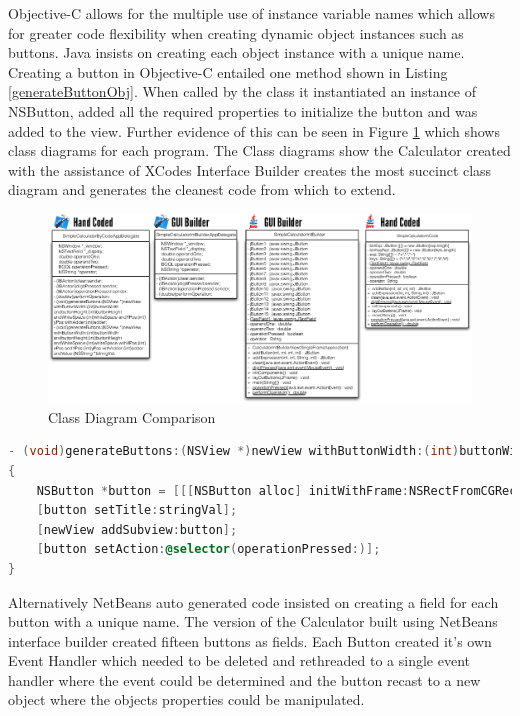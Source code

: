 \documentclass[a4paper,14pt]{article}
\begin{document}
Objective-C allows for the multiple use of instance variable names which allows for greater code flexibility when creating dynamic object instances such as buttons. Java insists on creating each object instance with a unique name. Creating a button in Objective-C entailed one method shown in Listing \ref{generateButtonObj}. When called by the class it instantiated an instance of NSButton, added all the required properties to initialize the button and was added to the view. Further evidence of this can be seen in Figure \ref{fig:classDiagrams} which shows class diagrams for each program. The Class diagrams show the Calculator created with the assistance of XCodes Interface Builder creates the most succinct class diagram and generates the cleanest code from which to extend.
\begin{figure}[H]
\centering
\includegraphics[scale=0.75]{ClassDiagrams.eps}
\caption{Class Diagram Comparison}
\label{fig:classDiagrams}
\end{figure}
\begin{lstlisting}[caption={Create Button - Objective-C},language=C,label=generateButtonObj,]
- (void)generateButtons:(NSView *)newView withButtonWidth:(int)buttonWidth andbuttonHeight:(int)buttonHeight andWhiteSpace:(int)whiteSpace withXPos:(int)xPos andYPos:(int)yPos withAdder:(int)adder andValue:(NSString *)stringVal
{
    NSButton *button = [[[NSButton alloc] initWithFrame:NSRectFromCGRect(CGRectMake(xPos, yPos , buttonWidth, buttonHeight)) ]autorelease];
    [button setTitle:stringVal];
    [newView addSubview:button];
    [button setAction:@selector(operationPressed:)];
}
\end{lstlisting}
Alternatively NetBeans auto generated code insisted on creating a field for each button with a unique name. The version of the Calculator built using NetBeans interface builder created fifteen buttons as fields. Each Button created it's own Event Handler which needed to be deleted and rethreaded to a single event handler where the event could be determined and the button recast to a new object where the objects properties could be manipulated.
\end{document}
